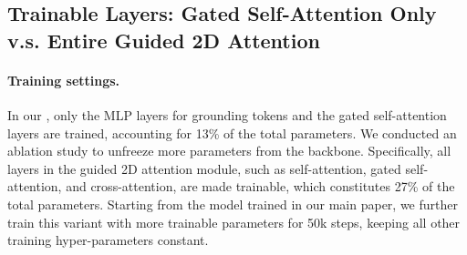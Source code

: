 \begin{table}[h]
\begin{center}
\end{center}
\caption{
Ablation of layout representation of our \method{} on MSR-VTT.
}
\label{table:ablation_spatial_control}
\end{table}




\subsection{Trainable Layers: Gated Self-Attention Only v.s. Entire Guided 2D Attention}


\paragraph{Training settings.} In our \videomodule{}, only the MLP layers for grounding tokens and the gated self-attention layers are trained, accounting for 13\% of the total parameters. We conducted an ablation study to unfreeze more parameters from the \modelscope{} backbone. Specifically, all layers in the guided 2D attention module, such as self-attention, gated self-attention, and cross-attention, are made trainable, which constitutes 27\% of the total parameters. Starting from the model trained in our main paper, we further train this variant with more trainable parameters for 50k steps, keeping all other training hyper-parameters constant. 



